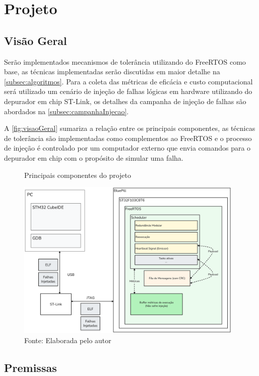 \chapter{Projeto}
\label{cap:proj}

\section{Visão Geral}

Serão implementados mecanismos de tolerância utilizando do FreeRTOS como base, as técnicas implementadas serão discutidas em maior detalhe na \autoref{subsec:algoritmos}. Para a coleta das métricas de eficácia e custo computacional será utilizado um cenário de injeção de falhas lógicas em hardware utilizando do depurador em chip ST-Link, os detalhes da campanha de injeção de falhas são abordados na \autoref{subsec:campanhaInjecao}.

A \autoref{fig:visaoGeral} sumariza a relação entre os principais componentes, as técnicas de tolerância são implementadas como complementos ao FreeRTOS e o processo de injeção é controlado por um computador externo que envia comandos para o depurador em chip com o propósito de simular uma falha.

\begin{figure}[H]
    \centering
    \captionsetup{justification=centering}
    \caption{Principais componentes do projeto}
    \includegraphics[width=0.97\textwidth]{assets/visao_geral.png}
    \captionsetup{justification=raggedright}
    \caption*{Fonte: Elaborada pelo autor}
    \label{fig:visaoGeral}
\end{figure}

\section{Premissas}

